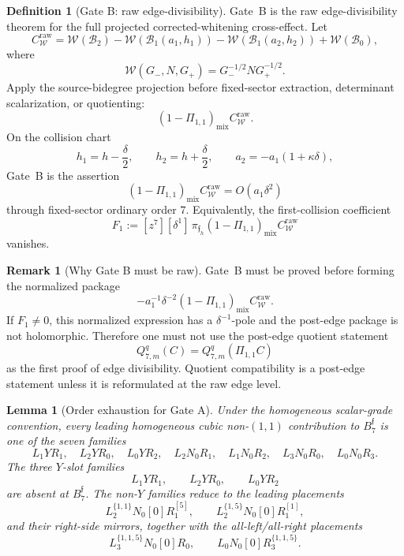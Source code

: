 \documentclass[11pt,a4paper]{amsart}
\theoremstyle{plain}
\newtheorem{lemma}[theorem]{Lemma}
\theoremstyle{definition}
\newtheorem{definition}[theorem]{Definition}
\newtheorem{remark}[theorem]{Remark}
\begin{document}
\begin{definition}[Gate B: raw edge-divisibility]
\label{def:gate-b-raw-edge-divisibility}
Gate~B is the raw edge-divisibility theorem for the full projected
corrected-whitening cross-effect.  Let
\[
C_{\mathcal W}^{\mathrm{raw}}
=
\mathcal W(\mathcal B_2)
-\mathcal W(\mathcal B_1(a_1,h_1))
-\mathcal W(\mathcal B_1(a_2,h_2))
+\mathcal W(\mathcal B_0),
\]
where
\[
\mathcal W(G_-,N,G_+)=G_-^{-1/2}NG_+^{-1/2}.
\]
Apply the source-bidegree projection before fixed-sector extraction,
determinant scalarization, or quotienting:
\[
(1-\Pi_{1,1})_{\mathrm{mix}}C_{\mathcal W}^{\mathrm{raw}}.
\]
On the collision chart
\[
h_1=h-\frac{\delta}{2},\qquad
h_2=h+\frac{\delta}{2},\qquad
a_2=-a_1(1+\kappa\delta),
\]
Gate~B is the assertion
\[
(1-\Pi_{1,1})_{\mathrm{mix}}C_{\mathcal W}^{\mathrm{raw}}
=
O(a_1\delta^2)
\]
through fixed-sector ordinary order \(7\).  Equivalently, the
first-collision coefficient
\[
F_1:=
[z^7][\delta^1]\,
\pi_{\mathfrak f_h}
(1-\Pi_{1,1})_{\mathrm{mix}}C_{\mathcal W}^{\mathrm{raw}}
\]
vanishes.
\end{definition}

\begin{remark}[Why Gate B must be raw]
\label{rem:why-gate-b-must-be-raw}
Gate~B must be proved before forming the normalized package
\[
-a_1^{-1}\delta^{-2}
(1-\Pi_{1,1})_{\mathrm{mix}}C_{\mathcal W}^{\mathrm{raw}}.
\]
If \(F_1\ne0\), this normalized expression has a \(\delta^{-1}\)-pole and
the post-edge package is not holomorphic.  Therefore one must not use the
post-edge quotient statement
\[
Q_{7,m}^q(C)=Q_{7,m}^q(\Pi_{1,1}C)
\]
as the first proof of edge divisibility.  Quotient compatibility is a
post-edge statement unless it is reformulated at the raw edge level.
\end{remark}

\begin{lemma}[Order exhaustion for Gate A]
\label{lem:gate-a-order-exhaustion}
Under the homogeneous scalar-grade convention, every leading homogeneous
cubic non-\((1,1)\) contribution to \(B_7^{\mathfrak f}\) is one of the
seven families
\[
L_1YR_1,\quad L_2YR_0,\quad L_0YR_2,\quad
L_2N_0R_1,\quad L_1N_0R_2,\quad
L_3N_0R_0,\quad L_0N_0R_3.
\]
The three \(Y\)-slot families
\[
L_1YR_1,\qquad L_2YR_0,\qquad L_0YR_2
\]
are absent at \(B_7^{\mathfrak f}\).  The non-\(Y\) families reduce to the
leading placements
\[
L_2^{\{1,1\}}N_0[0]R_1^{[5]},
\qquad
L_2^{\{1,5\}}N_0[0]R_1^{[1]},
\]
and their right-side mirrors, together with the all-left/all-right
placements
\[
L_3^{\{1,1,5\}}N_0[0]R_0,
\qquad
L_0N_0[0]R_3^{\{1,1,5\}}.
\]
\end{lemma}
\end{document}
